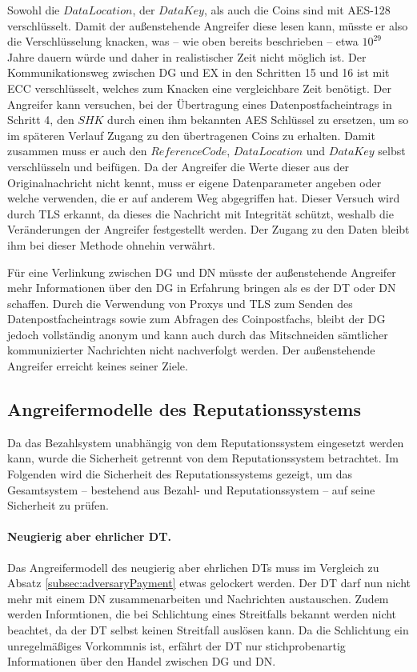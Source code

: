 \documentclass[
	fontsize=11pt,
	headings=small,
	parskip=half,           %
	bibliography=totoc,
	numbers=noenddot,       %
	open=any,               %
]{scrreprt}
\begin{document}
Sowohl die $DataLocation$, der $DataKey$, als auch die Coins sind mit AES-128 verschlüsselt. Damit der außenstehende Angreifer diese lesen kann, müsste er also die Verschlüsselung knacken, was -- wie oben bereits beschrieben -- etwa $10^{29}$ Jahre dauern würde und daher in realistischer Zeit nicht möglich ist. Der Kommunikationsweg zwischen DG und EX in den Schritten 15 und 16 ist mit ECC verschlüsselt, welches zum Knacken eine vergleichbare Zeit benötigt. Der Angreifer kann versuchen, bei der Übertragung eines Datenpostfacheintrags in Schritt 4, den $SHK$ durch einen ihm bekannten AES Schlüssel zu ersetzen, um so im späteren Verlauf Zugang zu den übertragenen Coins zu erhalten. Damit zusammen muss er auch den $ReferenceCode$, $DataLocation$ und $DataKey$ selbst verschlüsseln und beifügen. Da der Angreifer die Werte dieser aus der Originalnachricht nicht kennt, muss er eigene Datenparameter angeben oder welche verwenden, die er auf anderem Weg abgegriffen hat. Dieser Versuch wird durch TLS erkannt, da dieses die Nachricht mit Integrität schützt, weshalb die Veränderungen der Angreifer festgestellt werden. Der Zugang zu den Daten bleibt ihm bei dieser Methode ohnehin verwährt. 

Für eine Verlinkung zwischen DG und DN müsste der außenstehende Angreifer mehr Informationen über den DG in Erfahrung bringen als es der DT oder DN schaffen. Durch die Verwendung von Proxys und TLS zum Senden des Datenpostfacheintrags sowie zum Abfragen des Coinpostfachs, bleibt der DG jedoch vollständig anonym und kann auch durch das Mitschneiden sämtlicher kommunizierter Nachrichten nicht nachverfolgt werden. Der außenstehende Angreifer erreicht keines seiner Ziele.

\subsection{Angreifermodelle des Reputationssystems}
\label{subsec:adversaryRep}
Da das Bezahlsystem unabhängig von dem Reputationssystem eingesetzt werden kann, wurde die Sicherheit getrennt von dem Reputationssystem betrachtet. Im Folgenden wird die Sicherheit des Reputationssystems gezeigt, um das Gesamtsystem -- bestehend aus Bezahl- und Reputationssystem -- auf seine Sicherheit zu prüfen.

\paragraph{Neugierig aber ehrlicher DT.}
Das Angreifermodell des neugierig aber ehrlichen DTs muss im Vergleich zu Absatz \ref{subsec:adversaryPayment} etwas gelockert werden. Der DT darf nun nicht mehr mit einem DN zusammenarbeiten und Nachrichten austauschen. Zudem werden Informtionen, die bei Schlichtung eines Streitfalls bekannt werden nicht beachtet, da der DT selbst keinen Streitfall auslösen kann. Da die Schlichtung ein unregelmäßiges Vorkommnis ist, erfährt der DT nur stichprobenartig Informationen über den Handel zwischen DG und DN. 
\end{document}
